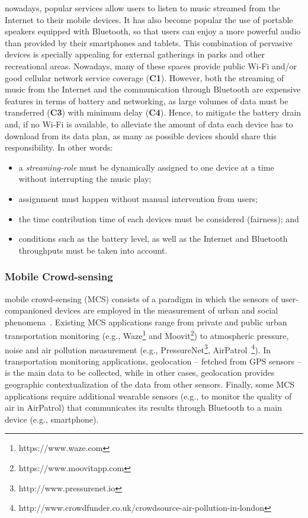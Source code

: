 nowadays, popular services allow users to listen to music streamed from the Internet to their mobile devices. It has also become popular the use of portable speakers equipped with Bluetooth, so that users can enjoy a more powerful audio than provided by their smartphones and tablets. This combination of pervasive devices is specially appealing for external gatherings in parks and other recreational areas. Nowadays, many of these spaces provide public Wi-Fi and/or good cellular network service coverage (\textbf{C1}). However, both the streaming of music from the Internet and the communication through Bluetooth are expensive features in terms of battery and networking, as large volumes of data must be transferred (\textbf{C3}) with minimum delay (\textbf{C4}). Hence, to mitigate the battery drain and, if no Wi-Fi is available, to alleviate the amount of data each device has to download from its data plan, as many as possible devices should  share this responsibility. In other words:

\begin{itemize}
	
	\item a \textit{streaming-role} must be dynamically assigned to one device at a time without interrupting the music play;
	
	\item assignment must happen without manual intervention from users;
	
	\item the time contribution time of each devices must be considered (fairness); and
	
	\item conditions such as the battery level, as well as the Internet and Bluetooth throughputs must be taken into account.
	
\end{itemize}




\subsubsection{Mobile Crowd-sensing}

mobile crowd-sensing (MCS) consists of a paradigm in which the sensors of user-companioned devices are employed in the measurement of urban and social phenomena~\cite{Guo:2015}. Existing MCS applications range from private and public urban transportation monitoring (e.g., Waze\footnote{https://www.waze.com} and Moovit\footnote{https://www.moovitapp.com}) to atmospheric pressure, noise and air pollution measurement (e.g., PressureNet\footnote{http://www.pressurenet.io}, AirPatrol~\footnote{http://www.crowdfunder.co.uk/crowdsource-air-pollution-in-london}). In transportation monitoring applications, geolocation -- fetched from GPS sensors -- is the main data to be collected, while in other cases, geolocation provides geographic contextualization of the data from other sensors. Finally, some MCS applications require additional wearable sensors (e.g., to monitor the quality of air in AirPatrol) that communicates its results through Bluetooth to a main device (e.g., smartphone).

